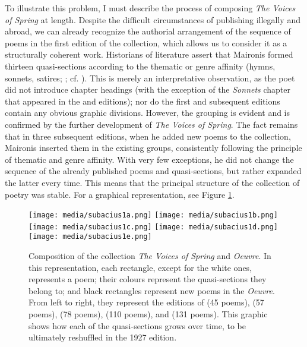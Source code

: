 \begin{paper}
To illustrate this problem, I must describe the process of
composing \emph{The Voices of Spring} at length. Despite the difficult
circumstances of publishing illegally and abroad,
we can already recognize the authorial arrangement of the sequence of poems in the first edition of the collection, which allows us to consider it as a structurally coherent work.
Historians of literature assert that Maironis formed thirteen
quasi-sections according to the thematic or genre affinity (hymns, sonnets,
satires; \citealt{speicyte_maironio_2019}; cf. \citealt{pokorska-iwaniuk_pavasario_2014}). This is merely an
interpretative observation, as the poet did not introduce chapter headings
(with the exception of the \emph{Sonnets} chapter that appeared in the \citeyear{maironis_pavasario_1913} and \citeyear{maironis_pavasario_1920}
editions); nor do the first and subsequent editions contain any
obvious graphic divisions. However, the grouping is evident and is
confirmed by the further development of \emph{The Voices of Spring}. The
fact remains that in three subsequent editions, when he added new poems to the collection,
Maironis inserted them in the existing groups, consistently following
the principle of thematic and genre affinity. With very few exceptions, he did not change the sequence of the already published poems and
quasi-sections, but rather expanded the latter every time. This means that the
principal structure of the collection of poetry  was stable. For a graphical representation, see Figure \ref{fig:subacius:composition}.

\begin{figure}
\centering
\texttt{[image: media/subacius1a.png]}
\texttt{[image: media/subacius1b.png]}
\texttt{[image: media/subacius1c.png]}
\texttt{[image: media/subacius1d.png]}
\texttt{[image: media/subacius1e.png]}
\caption{Composition of the collection \emph{The Voices of Spring}  \citep[133--41]{speicyte_maironio_2019} and \emph{Oeuvre}. In this representation, each rectangle, except for the white ones, represents a poem; their colours represent the  quasi-sections they belong to; and  black rectangles represent new poems in the \emph{Oeuvre}. From left to right, they represent the editions of \citeyear{maironis_pavasario_1895} (45 poems), \citeyear{maironis_pavasario_1905} (57 poems), \citeyear{maironis_pavasario_1913} (78 poems), \citeyear{maironis_pavasario_1920} (110 poems), and \citeyear{maironis_maironio_1927} (131 poems). This graphic shows how each of the quasi-sections grows over time, to be ultimately reshuffled in the 1927 edition.}
\label{fig:subacius:composition}
\end{figure}


\end{paper}
